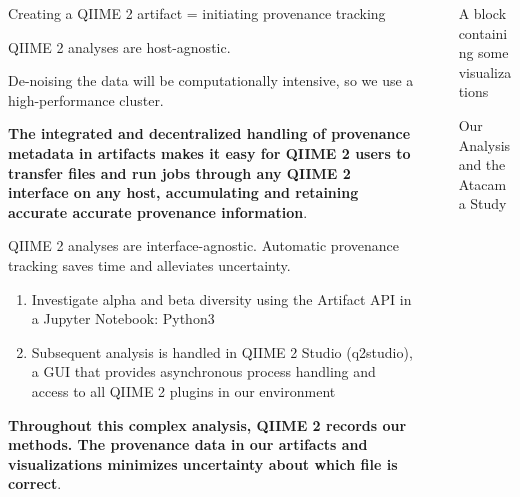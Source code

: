 \documentclass[final]{beamer}
\newlength{\sepwidth}
\newlength{\colwidth}
\newcommand{\separatorcolumn}{\begin{column}{\sepwidth}\end{column}}
\begin{document}
\begin{frame}[t]
\begin{columns}[t]
\begin{column}{\colwidth}
\begin{block}{Creating a QIIME 2 artifact = initiating provenance tracking}
  \end{block}

  \begin{block}{QIIME 2 analyses are host-agnostic.}

    De-noising the data will be computationally intensive, so we use a
    high-performance cluster.


    \textbf{The integrated and decentralized handling of provenance metadata in
    artifacts makes it easy for QIIME 2 users to transfer files and run jobs
    through any QIIME 2 interface on any host, accumulating and retaining
    accurate accurate provenance information}.

  \end{block}

  \begin{block}{QIIME 2 analyses are interface-agnostic. Automatic provenance tracking saves time and alleviates uncertainty.}

    \begin{enumerate}
      \item Investigate alpha and beta diversity using the Artifact API in
      a Jupyter Notebook\cite{PER-GRA:2007}: Python3
      \item Subsequent analysis is handled in QIIME 2 Studio (q2studio), a GUI
      that provides asynchronous process handling and access to all
      QIIME 2 plugins in our environment
    \end{enumerate}

    \textbf{Throughout this complex analysis, QIIME 2 records our methods.
    The provenance data in our artifacts and visualizations minimizes
    uncertainty about which file is correct}.

  \end{block}

\end{column}

\separatorcolumn

\begin{column}{\colwidth}

  \begin{block}{A block containing some visualizations}

  \end{block}

  \begin{block}{Our Analysis and the Atacama Study}


\end{block}
\end{column}
\end{columns}
\end{frame}
\end{document}

